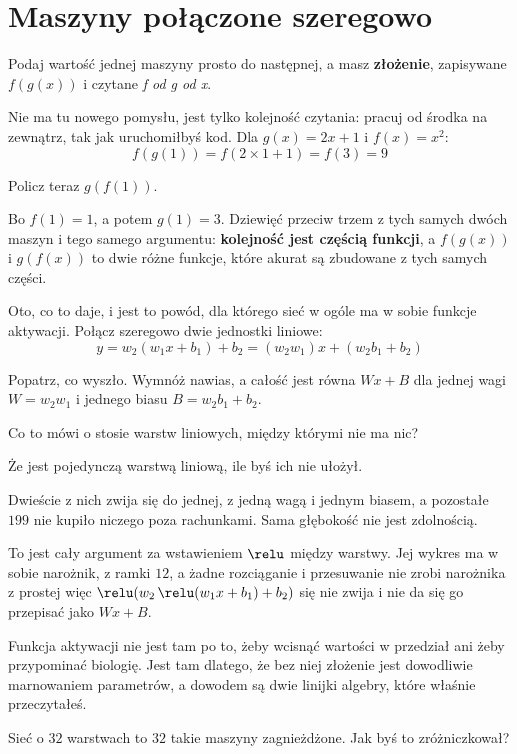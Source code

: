 \section{Maszyny połączone szeregowo}
\label{sec:F05-composition}

\begin{fr}
Podaj wartość jednej maszyny prosto do następnej, a masz \textbf{złożenie},
zapisywane $f(g(x))$ i czytane \emph{f od g od x}.

Nie ma tu nowego pomysłu, jest tylko kolejność czytania: pracuj od środka na
zewnątrz, tak jak uruchomiłbyś kod. Dla $g(x) = 2x + 1$ i $f(x) = x^{2}$:
\[ f(g(1)) = f(2 \times 1 + 1) = f(3) = 9 \]

Policz teraz $g(f(1))$.
\nextframe
\end{fr}

\begin{fr}
Bo $f(1) = 1$, a potem $g(1) = 3$. Dziewięć przeciw trzem z tych samych dwóch
maszyn i tego samego argumentu: \textbf{kolejność jest częścią funkcji}, a
$f(g(x))$ i $g(f(x))$ to dwie różne funkcje, które akurat są zbudowane z tych
samych części.

Oto, co to daje, i jest to powód, dla którego sieć w ogóle ma w sobie funkcje
aktywacji. Połącz szeregowo dwie jednostki liniowe:
\[ y = w_2(w_1 x + b_1) + b_2 = (w_2 w_1)x + (w_2 b_1 + b_2) \]

Popatrz, co wyszło. Wymnóż nawias, a całość jest równa $Wx + B$ dla jednej wagi
$W = w_2 w_1$ i jednego biasu $B = w_2 b_1 + b_2$.

Co to mówi o stosie warstw liniowych, między którymi nie ma nic?
\nextframe
\end{fr}

\begin{fr}
\begin{ansblock}
Że jest pojedynczą warstwą liniową, ile byś ich nie ułożył.
\end{ansblock}

Dwieście z nich zwija się do jednej, z jedną wagą i jednym biasem, a pozostałe
$199$ nie kupiło niczego poza rachunkami. Sama głębokość nie jest zdolnością.

\begin{aibox}
To jest cały argument za wstawieniem $\relu$ między warstwy. Jej wykres ma w
sobie narożnik, z ramki $12$, a żadne rozciąganie i przesuwanie nie zrobi
narożnika z prostej \dash{} więc
$\relu(w_2\,\relu(w_1 x + b_1) + b_2)$ się nie zwija i nie da się go przepisać
jako $Wx + B$.

Funkcja aktywacji nie jest tam po to, żeby wcisnąć wartości w przedział ani
żeby przypominać biologię. Jest tam dlatego, że bez niej złożenie jest
dowodliwie marnowaniem parametrów, a dowodem są dwie linijki algebry, które
właśnie przeczytałeś.
\end{aibox}

Sieć o $32$ warstwach to $32$ takie maszyny zagnieżdżone. Jak byś to
zróżniczkował?
\nextframe
\end{fr}

